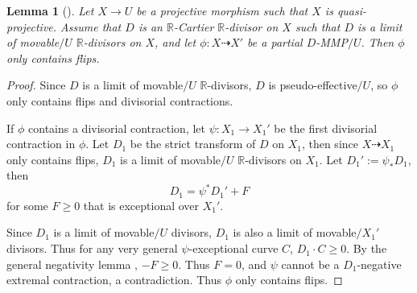 \documentclass[11pt]{amsart}
\numberwithin{equation}{section}
\newcommand{\Rr}{\mathbb{R}}
\newtheorem{lem}[thm]{Lemma}
\theoremstyle{definition}
\theoremstyle{definition}
\theoremstyle{definition}
\begin{document}
\begin{lem}[{\cite[Version 2, Lemma 2.38]{HL21}}]\label{lem: limit of movable divisors mmp only contain flips}
Let $X\rightarrow U$ be a projective morphism such that $X$ is quasi-projective. Assume that $D$ is an $\Rr$-Cartier $\Rr$-divisor on $X$ such that $D$ is a limit of movable$/U$ $\Rr$-divisors on $X$, and let $\phi: X\dashrightarrow X'$ be a partial $D$-MMP$/U$. Then $\phi$ only contains flips.
\end{lem}
\begin{proof}
Since $D$ is a limit of movable$/U$ $\Rr$-divisors, $D$ is pseudo-effective$/U$, so $\phi$ only contains flips and divisorial contractions. 

If $\phi$ contains a divisorial contraction, let $\psi: X_1\rightarrow X_1'$ be the first divisorial contraction in $\phi$. Let $D_1$ be the strict transform of $D$ on $X_1$, then since $X\dashrightarrow X_1$ only contains flips, $D_1$ is a limit of movable$/U$ $\Rr$-divisors on $X_1$. Let $D_1':=\psi_*D_1$, then
$$D_1=\psi^*D_1'+F$$
for some $F\geq 0$ that is exceptional over $X_1'$.

Since $D_1$ is a limit of movable$/U$ divisors,  $D_1$ is also a limit of movable$/X_1'$ divisors. 
Thus for any very general $\psi$-exceptional curve $C$, $D_1\cdot C\geq 0$. By the general negativity lemma \cite[Lemma 3.3]{Bir12}, $-F\geq 0$. Thus $F=0$, and $\psi$ cannot be a $D_1$-negative extremal contraction, a contradiction. Thus $\phi$ only contains flips.
\end{proof}
\end{document}
